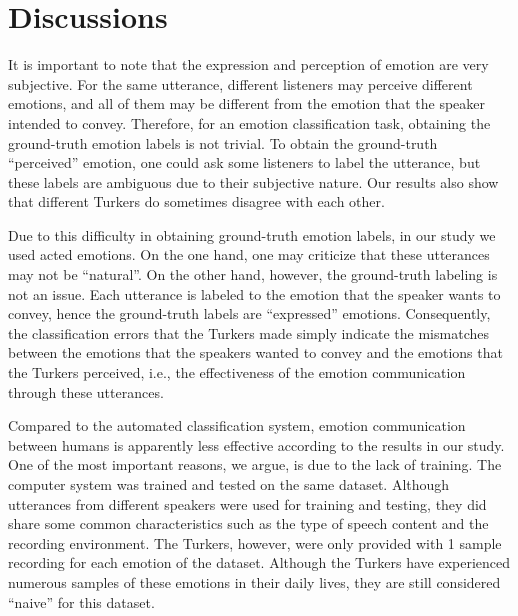 \documentclass{article}
\begin{document}
\section{Discussions}
It is important to note that the expression and perception of emotion are very subjective. For the same utterance, different listeners may perceive different emotions, and all of them may be different from the emotion that the speaker intended to convey. Therefore, for an emotion classification task, obtaining the ground-truth emotion labels is not trivial. To obtain the ground-truth ``perceived'' emotion, one could ask some listeners to label the utterance, but these labels are ambiguous due to their subjective nature. Our results also show that different Turkers do sometimes disagree with each other. \par
Due to this difficulty in obtaining ground-truth emotion labels, in our study we used acted emotions. On the one hand, one may criticize that these utterances may not be ``natural''. On the other hand, however, the ground-truth labeling is not an issue. Each utterance is labeled to the emotion that the speaker wants to convey, hence the ground-truth labels are ``expressed'' emotions. Consequently, the classification errors that the Turkers made simply indicate the mismatches between the emotions that the speakers wanted to convey and the emotions that the Turkers perceived, i.e., the effectiveness of the emotion communication through these utterances. \par
Compared to the automated classification system, emotion communication between humans is apparently less effective according to the results in our study. One of the most important reasons, we argue, is due to the lack of training. The computer system was trained and tested on the same dataset. Although utterances from different speakers were used for training and testing, they did share some common characteristics such as the type of speech content and the recording environment. The Turkers, however, were only provided with 1 sample recording for each emotion of the dataset. Although the Turkers have experienced numerous samples of these emotions in their daily lives, they are still considered ``naive'' for this dataset. \par
\end{document}
